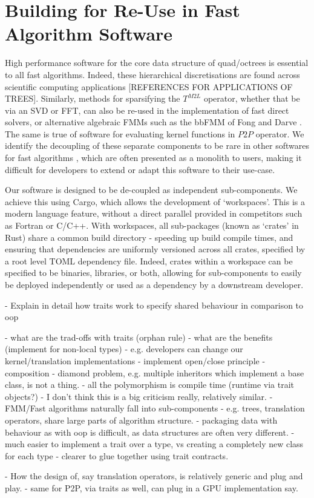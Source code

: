 \section{Building for Re-Use in Fast Algorithm Software}\label{chpt:2:sec:3}

High performance software for the core data structure of quad/octrees is essential to all fast algorithms. Indeed, these hierarchical discretisations are found across scientific computing applications [REFERENCES FOR APPLICATIONS OF TREES]. Similarly, methods for sparsifying the $T^{M2L}$ operator, whether that be via an SVD or FFT, can also be re-used in the implementation of fast direct solvers, or alternative algebraic FMMs such as the bbFMM of Fong and Darve \cite{fong2009black}. The same is true of software for evaluating kernel functions in $P2P$ operator. We identify the decoupling of these separate components to be rare in other softwares for fast algorithms \cite{malhotra2015pvfmm,wang2021exafmm,h2lib2016github}, which are often presented as a monolith to users, making it difficult for developers to extend or adapt this software to their use-case.

Our software is designed to be de-coupled as independent sub-components. We achieve this using Cargo, which allows the development of `workspaces'. This is a modern language feature, without a direct parallel provided in competitors such as Fortran or C/C++. With workspaces, all sub-packages (known as `crates' in Rust) share a common build directory - speeding up build compile times, and ensuring that dependencies are uniformly versioned across all crates, specified by a root level TOML dependency file. Indeed, crates within a workspace can be specified to be binaries, libraries, or both, allowing for sub-components to easily be deployed independently or used as a dependency by a downstream developer.

- Explain in detail how traits work to specify shared behaviour in comparison to oop

- what are the trad-offs with traits (orphan rule)
- what are the benefits (implement for non-local types)
    - e.g. developers can change our kernel/translation implementations
    - implement open/close principle - composition
    - diamond problem, e.g. multiple inheritors which implement a base class, is not a thing.
    - all the polymorphism is compile time (runtime via trait objects?)
        - I don't think this is a big criticism really, relatively similar.
    - FMM/Fast algorithms naturally fall into sub-components
        - e.g. trees, translation operators, share large parts of algorithm structure.
        - packaging data with behaviour as with oop is difficult, as data structures are often very different.
            - much easier to implement a trait over a type, vs creating a completely new class for each type
                - clearer to glue together using trait contracts.



- How the design of, say translation operators, is relatively generic and plug and play.
- same for P2P, via traits as well, can plug in a GPU implementation say.
